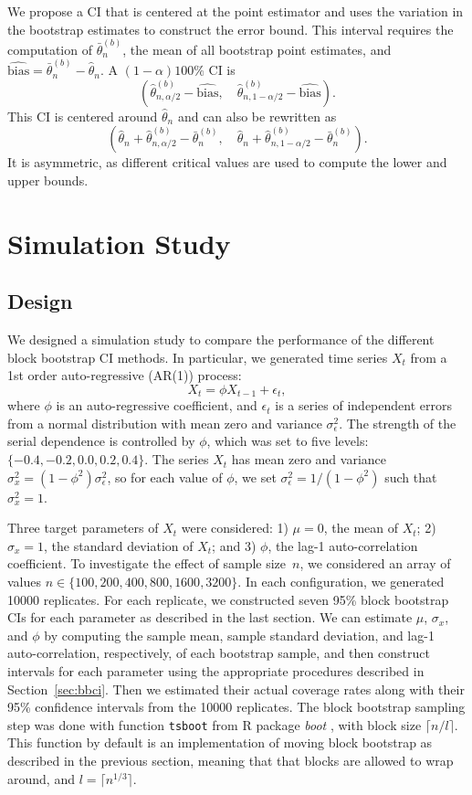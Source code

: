 \documentclass[12pt, letterpaper, titlepage]{article}
\begin{document}
We propose a CI that is centered at the point estimator and uses the variation
in the bootstrap estimates to construct the error bound. This interval requires
the computation of $\bar\theta_n^{(b)}$, the mean of all bootstrap point
estimates, and $\widehat{\text{bias}} = \bar\theta_n^{(b)} - \hat\theta_n$. A
$(1 - \alpha)100\%$ CI is
\[
(\hat\theta_{n, \alpha/2}^{(b)} - \widehat{\text{bias}}, \quad
\hat\theta_{n, 1 - \alpha/2}^{(b)} - \widehat{\text{bias}}).
\]
This CI is centered around $\hat\theta_n$ and can also be rewritten
as 
\[
(\hat\theta_n + \hat\theta_{n, \alpha/2}^{(b)} - \bar\theta_n^{(b)}, \quad
\hat\theta_n + \hat\theta_{n, 1 - \alpha/2}^{(b)} - \bar\theta_n^{(b)}).
\]
It is asymmetric, as different critical values are used to compute
the lower and upper bounds.


\section{Simulation Study}
\label{sec:simu}

\subsection{Design}
We designed a simulation study to compare the performance of the different
block bootstrap CI methods. In particular, we generated time series $X_t$ from
a 1st order auto-regressive (AR(1)) process:
\[
X_t = \phi X_{t-1} + \epsilon_t,
\]
where $\phi$ is an auto-regressive coefficient, and $\epsilon_t$ is a series of
independent errors from a normal distribution with mean zero and variance
$\sigma_{\epsilon}^2$. The strength of the serial dependence is controlled by
$\phi$, which was set to five levels: $\{-0.4, -0.2, 0.0, 0.2, 0.4\}$. The
series $X_t$ has mean zero and variance
$\sigma_x^2 = (1 - \phi^2) \sigma_{\epsilon}^2$, so for each value of $\phi$,
we set $\sigma_{\epsilon}^2 = 1 / (1 - \phi^2)$ such that $\sigma_x^2 = 1$.


Three target parameters of $X_t$ were considered:
1) $\mu = 0$, the mean of $X_t$;
2) $\sigma_x = 1$, the standard deviation of $X_t$; and
3) $\phi$, the lag-1 auto-correlation coefficient.
To investigate the effect of sample size~$n$, we considered an array of values
$n \in \{100, 200, 400, 800, 1600, 3200\}$. In each configuration, we
generated 10000 replicates. For each replicate, we constructed seven 95\% block
bootstrap CIs for each parameter as described in the last section. We can
estimate $\mu$, $\sigma_x$, and $\phi$ by computing the sample mean, sample 
standard deviation, and lag-1 auto-correlation, respectively, of each
bootstrap sample, and then construct intervals for each parameter using the
appropriate procedures described in Section~\ref{sec:bbci}. Then we estimated
their actual coverage rates along with their 95\% confidence intervals from
the 10000 replicates. The block bootstrap sampling step was done with function
\texttt{tsboot} from R package \textsl{boot} \citep{boot}, with block size
$\lceil n / l \rceil$. This function by default is an implementation of moving
block bootstrap as described in the previous section, meaning that that blocks
are allowed to wrap around, and $l = \lceil n^{1/3} \rceil$.
\end{document}
